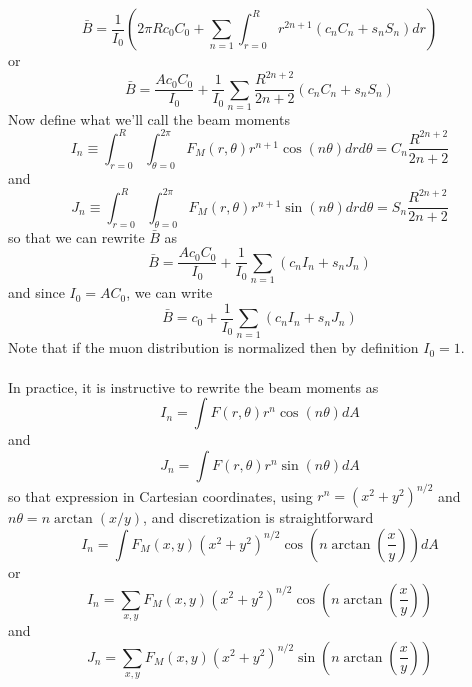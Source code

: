 \documentclass[twoside]{article}
\begin{document}
\begin{equation}
\bar{B} = \frac{1}{I_0}(2 \pi R c_0C_0 + \sum_{n=1} \int^R_{r=0} r^{2n + 1}(c_nC_n + s_n S_n ) dr  ) 
\end{equation}
or 
\begin{equation}
\bar{B} = 
\frac{A c_0 C_0}{I_0} + \frac{1}{I_0}\sum_{n=1} \frac{R^{2n + 2}}{2n+2}(c_nC_n + s_n S_n ) 
\end{equation}
Now define what we'll call the beam moments
\begin{equation}
\boxed{
	I_n \equiv \int^{R}_{r = 0}  \int^{2\pi}_{\theta = 0} F_M(r,\theta) r^{n+1} \cos(n\theta) dr d\theta = C_n\frac{R^{2n+2}}{2n + 2}
}
\end{equation}
and
\begin{equation}
\boxed{
	J_n \equiv \int^{R}_{r = 0}  \int^{2\pi}_{\theta = 0} F_M(r,\theta) r^{n+1} \sin(n\theta) dr d\theta = S_n\frac{R^{2n+2}}{2n + 2}
}
\end{equation}
so that we can rewrite $\bar{B}$ as
\begin{equation}
\bar{B} = 
\frac{A c_0 C_0}{I_0} + \frac{1}{I_0}\sum_{n=1}(c_n I_n + s_n J_n ) 
\end{equation}
and since $I_0 = A C_0$, we can write
\begin{equation}
\boxed{
\bar{B} = 
c_0 + \frac{1}{I_0}\sum_{n=1}(c_n I_n + s_n J_n ) 
}
\end{equation}
Note that if the muon distribution is normalized then by definition $I_0 = 1$. \\
\\
In practice, it is instructive to rewrite the beam moments as
\begin{equation}
	I_n = \int F(r,\theta) r^{n} \cos(n\theta) dA 
\end{equation}
and
\begin{equation}
J_n = \int F(r,\theta) r^{n} \sin(n\theta) dA 
\end{equation}
so that expression in Cartesian coordinates, using $r^n=(x^2 + y^2)^{n/2}$ and $n \theta = n \arctan(x/y)$, and discretization is straightforward
\begin{equation}
I_n =  \int F_M(x,y) (x^2 + y^2)^{n/2} \cos(n  \arctan(\frac{x}{y})) dA 
\end{equation}
or 
\begin{equation}
\boxed{
I_n =  \sum_{x,y} F_M(x,y) (x^2 + y^2)^{n/2} \cos(n  \arctan(\frac{x}{y}))
}
\end{equation}
and
\begin{equation}
\boxed{
	J_n =  \sum_{x,y} F_M(x,y) (x^2 + y^2)^{n/2} \sin(n  \arctan(\frac{x}{y}))
}
\end{equation}
\end{document}

